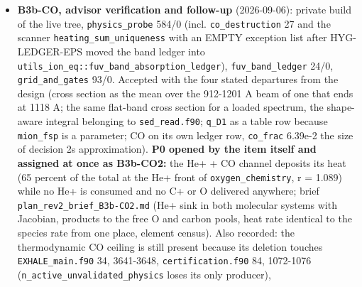 \documentclass[english,a4paper]{my_memo}
\begin{document}
\begin{itemize}
  contraction ratio spreads 200 percent cell by cell within a step. \textbf{The
  lever is a Newton on (T, composition) taken cell by cell with \texttt{dc/dT\ =\ -(dF/dc)\^{}-1\ dF/dT} from the factorization \texttt{hybrd} already forms, inside the sweep
  (\texttt{ionization\_equilibrium.f90}), plus the two-pass rest mask with an
  acceptance class inherited by masked cells}: assigned as COST2, after
  B3b-CO releases that file. Also fixed: the cost line divided passes over
  loop entries by adopted steps (could report a mean above the worst);
  \texttt{heat\_channel\_state} is in the checkpoint with two assertions
  (\texttt{attempted\_step} 97/0, \texttt{coupled\_source\_step} 36/0; advisor rebuild and
  rerun green). Outside scope recorded: \texttt{EXHALE\_ERR\_EVERY} read in both modes
  but the probe runs only in phys; \texttt{mol\_base\_handoff} in phys mode refuses 7
  of its first 20 steps at the fixed point (pass cap at step 0), recovers.
\item
  \textbf{B3b-CO, advisor verification and follow-up} (2026-09-06): private build
  of the live tree, \texttt{physics\_probe} 584/0 (incl. \texttt{co\_destruction} 27 and the
  scanner \texttt{heating\_sum\_uniqueness} with an EMPTY exception list after
  HYG-LEDGER-EPS moved the band ledger into \texttt{utils\_ion\_eq::fuv\_band\_absorption\_ledger}),
  \texttt{fuv\_band\_ledger} 24/0, \texttt{grid\_and\_gates} 93/0. Accepted with the four stated
  departures from the design (cross section as the mean over the 912-1201 A
  beam of one that ends at 1118 A; the same flat-band cross section for a
  loaded spectrum, the shape-aware integral belonging to \texttt{sed\_read.f90};
  \texttt{q\_D1} as a table row because \texttt{mion\_fsp} is a parameter; CO on its own
  ledger row, \texttt{co\_frac} 6.39e-2 the size of decision 2\textquotesingle s approximation).
  \textbf{P0 opened by the item itself and assigned at once as B3b-CO2:} the He+ +
  CO channel deposits its heat (65 percent of the total at the He+ front of
  \texttt{oxygen\_chemistry}, r = 1.089) while no He+ is consumed and no C+ or O
  delivered anywhere; brief \texttt{plan\_rev2\_brief\_B3b-CO2.md} (He+ sink in both
  molecular systems with Jacobian, products to the free O and carbon pools,
  heat rate identical to the species rate from one place, element census).
  Also recorded: the thermodynamic CO ceiling is still present because its
  deletion touches \texttt{EXHALE\_main.f90} 34, 3641-3648, \texttt{certification.f90} 84,
  1072-1076 (\texttt{n\_active\_unvalidated\_physics} loses its only producer),

\end{itemize}
\end{document}
